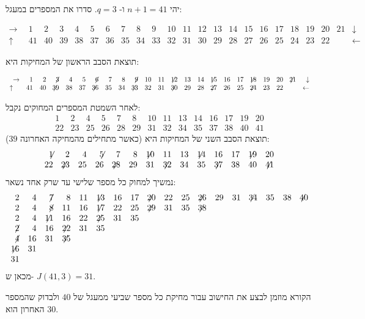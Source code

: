 \begin{example}
יהי
$n+1=41$
ו-%
$q=3$.
סדרו את המספרים במעגל:
\begin{scriptsize}
\[
\begin{array}{rrrrrrrrrrrrrrrrrrrrrrr}
\rightarrow&1&2&3&4&5&6&7&8&9&10&
           11&12&13&14&15&16&17&18&19&20&21&
\downarrow\\
\uparrow\quad&41&40&39&38&37&36&35&34&33&
32&31&30&29&28&27&26&25&24&23&22&
&\leftarrow
\end{array}
\]
\end{scriptsize}
תוצאת הסבב הראשון של המחיקות היא:
\begin{scriptsize}
\[
\begin{array}{rrrrrrrrrrrrrrrrrrrrrrr}
\rightarrow&1&2&\not\! 3&4&5&\not\! 6&7&8&\not\! 9&10&
           11&\not\!\! 12&13&14&\not\!\! 15&16&17&\not\!\! 18&19&20&\not\!\! 21&
\downarrow\\
	\uparrow\quad&41&40&\not\!\! 39&38&37&\not\!\! 36&35&34&\not\!\! 33&
32&31&\not\!\! 30&29&28&\not\!\! 27&26&25&\not\!\! 24&23&22&
&\leftarrow
\end{array}
\]
\end{scriptsize}
לאחר השמטת המספרים המחוקים נקבל:
\[
\begin{array}{rrrrrrrrrrrrrrrrrrrrrrrrrrrr}
1&2&4&5&7&8&10&11&13&14&16&17&19&20\\
22&23&25&26&28&29&31&32&34&35&37&38&40&41
\end{array}
\]
תוצאת הסבב השני של המחיקות היא (כאשר מתחילים מהמחיקה האחרונה
$39$):
\[
\begin{array}{rrrrrrrrrrrrrrrrrrrrrrrrrrrr}
\not\!\! 1&2&4&\not\!\! 5&7&8&\not\!\! 10&11&13&\not\!\! 14&16&17&\not\!\! 19&20\\
22&\not\!\! 23&25&26&\not\!\! 28&29&31&\not\!\! 32&34&35&\not\!\! 37&38&40&\not\!\! 41
\end{array}
\]
נמשיך למחוק כל מספר שלישי עד שרק אחד נשאר:
\[
\begin{array}{rrrrrrrrrrrrrrrrrr}
2&4&\not\!7&8&11&\not\!\!13&16&17&\not\!\!20&22&25&\not\!\!26&29&31&\not\!\!34&35&38&\not\!\!40
\\
2&4&\not\!8&11&16&\not\!\!17&22&25&\not\!\!29&31&35&\not\!\!38
\\
2&4&\not\!\!11&16&22&\not\!\!25&31&35
\\
\not\!2&4&16&\not\!\!22&31&35
\\
\not\!4&16&31&\not\!\!35
\\
\not\!\!16&31
\\
31
\end{array}
\]
מכאן ש-%
$J(41,3)=31$.
\end{example}
הקורא מוזמן לבצע את החישוב עבור מחיקת כל מספר שביעי ממעגל של 
$40$
ולבדוק שהמספר האחרון הוא
$30$.

